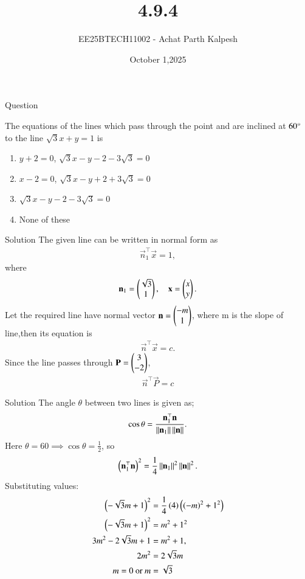 \documentclass{beamer}
\title %
{4.9.4}
\date{October 1,2025}
\author %
{EE25BTECH11002 - Achat Parth Kalpesh}
\begin{document}
\frame{\titlepage}

\begin{frame}{Question}

 The equations of the lines which pass through the point  and are inclined at $60\degree$ to the line $\sqrt{3} x+y=1$ is
\begin{enumerate}
\item $y+2=0$, $\sqrt{3}x-y-2-3\sqrt{3}=0$
\item $x-2=0$, $\sqrt{3}x-y+2+3\sqrt{3}=0$
\item $\sqrt{3}x-y-2-3\sqrt{3}=0$
\item None of these
\end{enumerate}
\end{frame}
\begin{frame}{Solution}
The given line can be written in normal form as
\begin{align}
    \vec{n}_1^\top \vec{x} = 1,
\end{align}
where
\begin{align}
    \mathbf{n}_1 = \begin{pmatrix}\sqrt{3}\\1\end{pmatrix}, \quad \mathbf{x} = \begin{pmatrix}x\\y\end{pmatrix}.
\end{align}
Let the required line have normal vector $\mathbf{n}=\begin{pmatrix}-m\\1\end{pmatrix}$, where m is the slope of line,then its equation is
\begin{align}
    \vec{n}^\top \vec{x} = c.
\end{align}
Since the line passes through $\mathbf{P}=\begin{pmatrix}3\\-2\end{pmatrix}$,
\begin{align}
     \vec{n}^\top \vec{P} = c
\end{align}

\end{frame}
\begin{frame}{Solution}
The angle $\theta$ between two lines is given as;
\begin{align}
    \cos\theta = \frac{\mathbf{n}_1^\top \mathbf{n}}{\left\lVert\mathbf{n}_1\right\rVert\left\lVert\mathbf{n}\right\rVert}.
\end{align}
Here $\theta = $60\degree$ \implies \cos\theta = \frac{1}{2}$, so
\begin{align}
    \left(\mathbf{n}_1^\top \mathbf{n}\right)^2 = \frac{1}{4}\left\lVert\mathbf{n}_1\right\rVert^2 \left\lVert\mathbf{n}\right\rVert^2.
\end{align}
Substituting values:
\begin{align}
    \left(-\sqrt{3}m + 1\right)^2 &= \frac{1}{4}\left(4\right)\left(\left(-m\right)^2+1^2\right)\\
    \left(-\sqrt{3}m + 1\right)^2 &= m^2 + 1^2\\
    3m^2 - 2\sqrt{3}m + 1 &= m^2 + 1, \\
    2m^2 &= 2\sqrt{3}m  \\
    m = 0 \text{ or } m &= \sqrt{3}
\end{align}
\end{frame}
\end{document}
